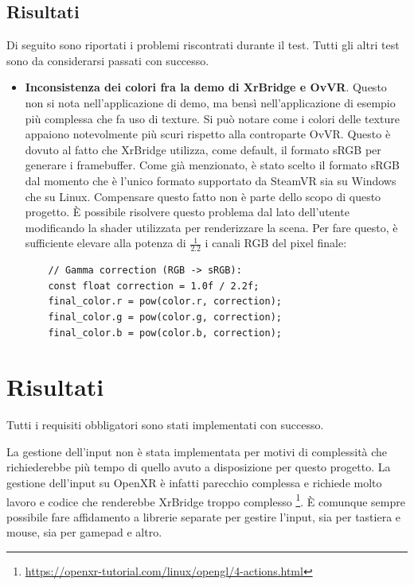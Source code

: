 \documentclass[twoside]{supsistudent}
\begin{document}
\section{Risultati}

Di seguito sono riportati i problemi riscontrati durante il test. Tutti gli altri test sono da considerarsi passati con successo.

\begin{itemize}
  \item \textbf{Inconsistenza dei colori fra la demo di XrBridge e OvVR}. Questo non si nota nell'applicazione di demo, ma bensì nell'applicazione di esempio più complessa che fa uso di texture. Si può notare come i colori delle texture appaiono notevolmente più scuri rispetto alla controparte OvVR. Questo è dovuto al fatto che XrBridge utilizza, come default, il formato sRGB per generare i framebuffer. Come già menzionato, è stato scelto il formato sRGB dal momento che è l'unico formato supportato da SteamVR sia su Windows che su Linux. Compensare questo fatto non è parte dello scopo di questo progetto. È possibile risolvere questo problema dal lato dell'utente modificando la shader utilizzata per renderizzare la scena. Per fare questo, è sufficiente elevare alla potenza di $ \frac{1}{2.2} $ i canali RGB del pixel finale:
  \begin{verbatim}
    // Gamma correction (RGB -> sRGB):
    const float correction = 1.0f / 2.2f;
    final_color.r = pow(color.r, correction);
    final_color.g = pow(color.g, correction);
    final_color.b = pow(color.b, correction);
  \end{verbatim}
\end{itemize}

\chapter{Risultati}

Tutti i requisiti obbligatori sono stati implementati con successo.

La gestione dell'input non è stata implementata per motivi di complessità che richiederebbe più tempo di quello avuto a disposizione per questo progetto. La gestione dell'input su OpenXR è infatti parecchio complessa e richiede molto lavoro e codice che renderebbe XrBridge troppo complesso \footnote{\url{https://openxr-tutorial.com/linux/opengl/4-actions.html}}. È comunque sempre possibile fare affidamento a librerie separate per gestire l'input, sia per tastiera e mouse, sia per gamepad e altro.
\end{document}
